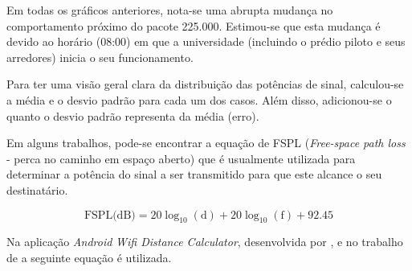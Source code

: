 Em todas os gráficos anteriores, nota-se uma abrupta mudança no comportamento próximo do pacote 225.000.
Estimou-se que esta mudança é devido ao horário (08:00) em que a universidade
(incluindo o prédio piloto e seus arredores) inicia o seu funcionamento.

Para ter uma visão geral clara da distribuição das potências de sinal, calculou-se
a média e o desvio padrão para cada um dos casos. Além disso, adicionou-se o
quanto o desvio padrão representa da média (erro).

\begin{table}[htb]
\end{table}


Em alguns trabalhos, pode-se
encontrar a equação de FSPL (\emph{Free-space path loss} - perca no caminho em
espaço aberto) que é usualmente utilizada para determinar a potência do sinal
a ser transmitido para que este alcance o seu destinatário.

\begin{equation}
	{\mbox{FSPL(dB)}}=20\log _{{10}}(\text{d})+20\log _{{10}}(\text{f})+92.45
\end{equation}

Na aplicação \emph{Android} \emph{Wifi Distance Calculator}, desenvolvida por
, e no trabalho de  a seguinte
equação é utilizada.


